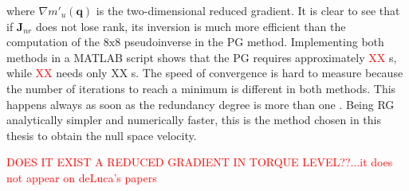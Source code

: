 where $\nabla m'_u(\mathbf{q})$ is the  two-dimensional reduced gradient.  It is clear to see that if $\mathbf{J}_{nr}$ does not lose rank, its inversion is much more efficient than the computation of the $\mathrm{8x8}$ pseudoinverse in the PG method. 
Implementing both methods in a MATLAB script shows that the PG requires approximately \textcolor{red}{XX} s, while \textcolor{red}{XX} needs only XX s.  The speed of convergence is hard to measure because the number of iterations to reach a minimum is different in both methods. This happens always as soon as the redundancy degree is more than one \cite{reduced_gradient}. 
Being RG analytically simpler and numerically faster, this is the method chosen in this thesis to obtain the null space velocity. 




\textcolor{red}{DOES IT EXIST A REDUCED GRADIENT IN TORQUE LEVEL??...it does not appear on deLuca's papers}






%











